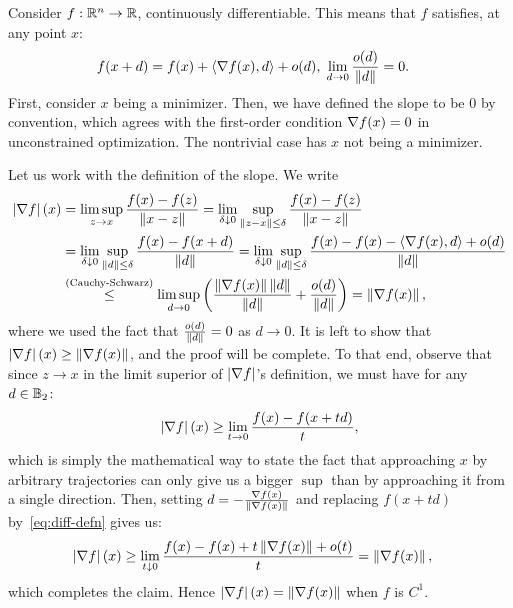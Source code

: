 \documentclass[10pt]{article}
\begin{document}
\vspace{1em}

\begin{Exercise}
	\label{ex:p2}
	Consider $f: \mathbb{R}^n \to \mathbb{R}$, continuously differentiable. This means that
	$f$ satisfies, at any point $x$:
	\begin{align}
		f(x + d) &= f(x) + \left\langle \nabla f(x), d \right\rangle + o(d), \;
		\lim_{d \to 0} \frac{o(d)}{\left \| d \right \|} = 0.
		\label{eq:diff-defn}
	\end{align}
	First, consider $x$ being a minimizer. Then, we have defined the slope to
	be $0$ by convention, which agrees with the first-order condition $\nabla
	f(x) = 0$ in unconstrained optimization. The nontrivial case has $x$ not
	being a minimizer.

	Let us work with the definition of the slope. We write
	\begin{align*}
		\left| \nabla f \right|(x) &= \limsup_{z \to x} \frac{f(x) - f(z)}{\left \| x - z \right \|}
		= \lim_{\delta \downarrow 0} \sup_{\left \| z - x \right \| \leq \delta} \frac{f(x) -
		f(z)}{\left \| x - z \right \|} \\
			&= \lim_{\delta \downarrow 0} \sup_{\left \| d \right \| \leq \delta}
			\frac{f(x) - f(x + d)}{\left \| d \right \|} =
				\lim_{\delta \downarrow 0} \sup_{\left \| d \right \| \leq \delta}
			\frac{f(x) - f(x) - \left\langle \nabla f(x), d \right\rangle + o(d)}{\left \| d \right \|} \\
			&\overset{(\text{Cauchy-Schwarz})}{\leq} \limsup_{d \to 0} \left(
				\frac{\left \| \nabla f(x) \right \| \left \| d \right \|}{\left \| d \right \|} +
			  	\frac{o(d)}{\left \| d \right \|} \right) = \left \| \nabla f(x) \right \|,
	\end{align*}
	where we used the fact that $\frac{o(d)}{\left \| d \right \|} = 0$ as $d \to 0$.
	It is left to show that $\left| \nabla f \right|(x) \geq \left \| \nabla f(x) \right \|$, and the
	proof will be complete. To that end, observe that since $z \to x$ in the
	limit superior of $\left| \nabla f \right|$'s definition, we must have for any
	$d \in \mathbb{B}_2$:
	\[
		\left| \nabla f \right|(x) \geq \lim_{t \to 0} \frac{f(x) - f(x + td)}{t},
	\]
	which is simply the mathematical way to state the fact that approaching $x$
	by arbitrary trajectories can only give us a bigger $\sup$ than by
	approaching it from a single direction. Then, setting $d = -\frac{\nabla
	f(x)}{\left \| \nabla f(x) \right \|}$ and replacing $f(x + td)$ by~\cref{eq:diff-defn}
	gives us:
	\begin{align*}
		\left| \nabla f \right|(x) &\geq
		\lim_{t \downarrow 0} \frac{f(x) - f(x) + t \left \| \nabla f(x) \right \| + o(t)}{t}
			= \left \| \nabla f(x) \right \|,
	\end{align*}
	which completes the claim. Hence $\left| \nabla f \right|(x) = \left \| \nabla f(x) \right \|$
	when $f$ is $C^1$.
\end{Exercise}
\end{document}
